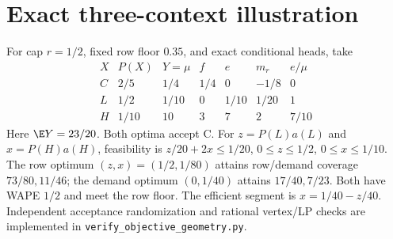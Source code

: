 \section{Exact three-context illustration}
\label{app:geometry}
For cap $r=1/2$, fixed row floor $0.35$, and exact conditional heads, take
\[
\begin{array}{c|rrrrrr}
X&P(X)&Y=\mu&f&e&m_r&e/\mu\\\hline
C&2/5&1/4&1/4&0&-1/8&0\\
L&1/2&1/10&0&1/10&1/20&1\\
H&1/10&10&3&7&2&7/10
\end{array}
\]
Here $\E Y=23/20$. Both optima accept C. For $z=P(L)a(L)$ and $x=P(H)a(H)$, feasibility is $z/20+2x\leq1/20$, $0\leq z\leq1/2$, $0\leq x\leq1/10$. The row optimum $(z,x)=(1/2,1/80)$ attains row/demand coverage $73/80,11/46$; the demand optimum $(0,1/40)$ attains $17/40,7/23$. Both have WAPE $1/2$ and meet the row floor. The efficient segment is $x=1/40-z/40$. Independent acceptance randomization and rational vertex/LP checks are implemented in \texttt{verify\_objective\_geometry.py}.
